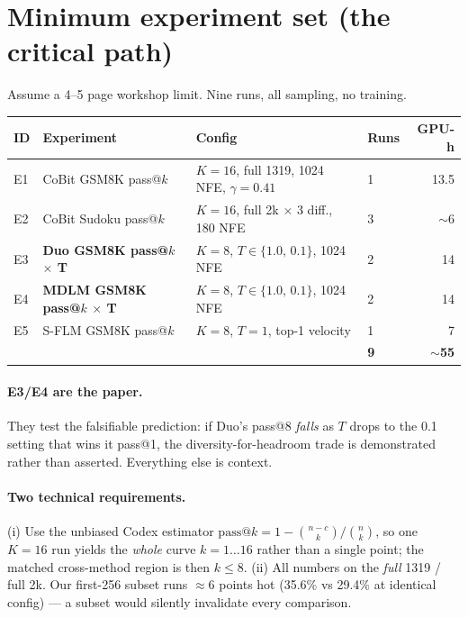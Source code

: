 \documentclass[11pt,a4paper]{article}
\begin{document}
\section{Minimum experiment set (the critical path)}

Assume a 4--5 page workshop limit. Nine runs, all sampling, no training.

\begin{center}\small
\begin{tabular}{@{}llllr@{}}
\toprule
ID & Experiment & Config & Runs & GPU-h \\ \midrule
E1 & CoBit GSM8K pass@$k$ & $K{=}16$, full 1319, 1024 NFE, $\gamma{=}0.41$ & 1 & 13.5 \\
E2 & CoBit Sudoku pass@$k$ & $K{=}16$, full 2k $\times$ 3 diff., 180 NFE & 3 & $\sim$6 \\
E3 & \textbf{Duo GSM8K pass@$k$ $\times$ T} & $K{=}8$, $T\in\{1.0,\,0.1\}$, 1024 NFE & 2 & 14 \\
E4 & \textbf{MDLM GSM8K pass@$k$ $\times$ T} & $K{=}8$, $T\in\{1.0,\,0.1\}$, 1024 NFE & 2 & 14 \\
E5 & S-FLM GSM8K pass@$k$ & $K{=}8$, $T{=}1$, top-1 velocity & 1 & 7 \\
\midrule
& & & \textbf{9} & \textbf{$\sim$55} \\
\bottomrule
\end{tabular}
\end{center}

\paragraph{E3/E4 are the paper.} They test the falsifiable prediction: if Duo's pass@8
\emph{falls} as $T$ drops to the 0.1 setting that wins it pass@1, the diversity-for-headroom
trade is demonstrated rather than asserted. Everything else is context.

\paragraph{Two technical requirements.}
(i) Use the unbiased Codex estimator $\text{pass@}k = 1-\binom{n-c}{k}\big/\binom{n}{k}$, so one
$K{=}16$ run yields the \emph{whole} curve $k{=}1\ldots16$ rather than a single point; the
matched cross-method region is then $k\le 8$.
(ii) All numbers on the \emph{full} 1319 / full 2k. Our first-256 subset runs $\approx$6 points
hot (35.6\% vs 29.4\% at identical config) --- a subset would silently invalidate every
comparison.
\end{document}
